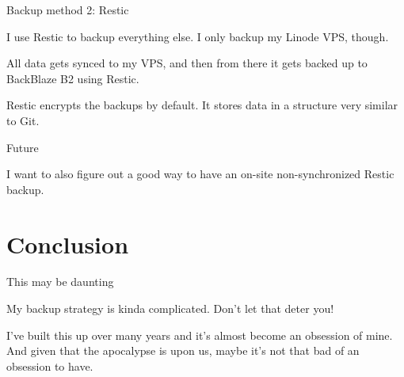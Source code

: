 \documentclass{lug}
\begin{document}
\begin{frame}{Backup method 2: Restic}

    I use Restic to backup everything else. I only backup my Linode VPS, though.

    \pause
    All data gets synced to my VPS, and then from there it gets backed up to
    BackBlaze B2 using Restic.

    \pause
    Restic encrypts the backups by default. It stores data in a structure very
    similar to Git.

\end{frame}

\begin{frame}{Future}

    I want to also figure out a good way to have an on-site non-synchronized
    Restic backup.

\end{frame}

\section{Conclusion}

\begin{frame}{This may be daunting}

    My backup strategy is kinda complicated. Don't let that deter you!

    \pause
    I've built this up over many years and it's almost become an obsession of
    mine. \pause And given that the apocalypse is upon us, maybe it's not that
    bad of an obsession to have.

\end{frame}
\end{document}
